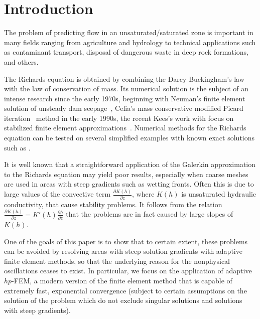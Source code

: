 \documentclass[final,3p,times,twocolumn]{elsarticle}
\begin{document}


\section{Introduction}
\label{sec:intro}

The problem of predicting flow in an unsaturated/saturated zone is 
important in many fields ranging from agriculture and hydrology to technical 
applications such as contaminant transport, disposal of dangerous waste in deep 
rock formations, and others.

The Richards equation is obtained by combining the Darcy-Buckingham's law
with the law of conservation of mass. Its numerical solution 
is the subject of an intense research since the early 1970s, beginning with Neuman's 
finite element solution of unsteady dam seepage~\cite{neuman1}, Celia's mass 
conservative modified Picard iteration~\cite{celia} method in the early 1990s, 
 the recent Kees's work with focus on stabilized finite element 
approximations~\cite{kees,kees2,kees3}.
Numerical methods for the Richards equation
can be tested on several simplified examples with known exact solutions 
such as \cite{tracy1,tracy2}. 

It is well known that a straightforward application of the Galerkin approximation
to the Richards equation may yield poor results, especially when coarse meshes are 
used in areas with steep gradients such as wetting fronts.
Often this is due to large values of the convective term 
$\frac{\partial K(h)}{\partial z}$, where $K(h)$ is unsaturated hydraulic 
conductivity, that cause stability problems.
It follows from the relation  $\frac{\partial K(h)}{\partial z}=K'(h)\frac{\partial h}{\partial z}$
that the problems are in fact caused by large slopes of $K(h)$. 

One of the goals of this paper is to show that to certain extent, these problems 
can be avoided by resolving areas with steep solution gradients with adaptive 
finite element methods, so that 
the underlying reason for the nonphysical oscillations ceases to exist. In particular,
we focus on the application of adaptive $hp$-FEM, a modern version of the finite element 
method that is capable of extremely fast, exponential convergence \cite{babuska1}
(subject to certain assumptions on the solution of the problem which do not exclude
singular solutions and solutions with steep gradients).
\end{document}
